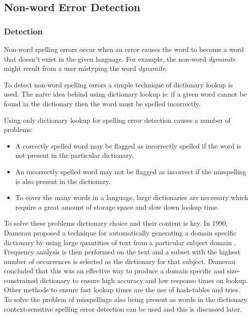 \subsection{Non-word Error Detection}

\subsubsection{Detection}

Non-word spelling errors occur when an error causes the word to become a word that doesn't exist in the given language. For example, the non-word \emph{dymanite} might result from a user mistyping the word \emph{dynamite}.

To detect non-word spelling errors a simple technique of dictionary lookup is used. The naive idea behind using dictionary lookup is: if a given word cannot be found in the dictionary then the word must be spelled incorrectly.

Using only dictionary lookup for spelling error detection causes a number of problems: 

\begin{itemize}
\item
A correctly spelled word may be flagged as incorrectly spelled if the word is not present in the particular dictionary.
\item
An incorrectly spelled word may not be flagged as incorrect if the misspelling is also present in the dictionary.
\item
To cover the many words in a language, large dictionaries are necessary which require a great amount of storage space and slow down lookup time.
\end{itemize} 

To solve these problems dictionary choice and their content is key. In 1990, Damerau proposed a technique for automatically generating a domain specific dictionary by using large quantities of text from a particular subject domain \cite{Damerau1990}. Frequency analysis is then performed on the text and a subset with the highest number of occurrences is selected as the dictionary for that subject. Damerau concluded that this was an effective way to produce a domain specific and size-constrained dictionary to ensure high accuracy and low response times on lookup. Other methods to ensure fast lookup times are the use of hash-tables and tries. To solve the problem of misspellings also being present as words in the dictionary context-sensitive spelling error detection can be used and this is discussed later.

